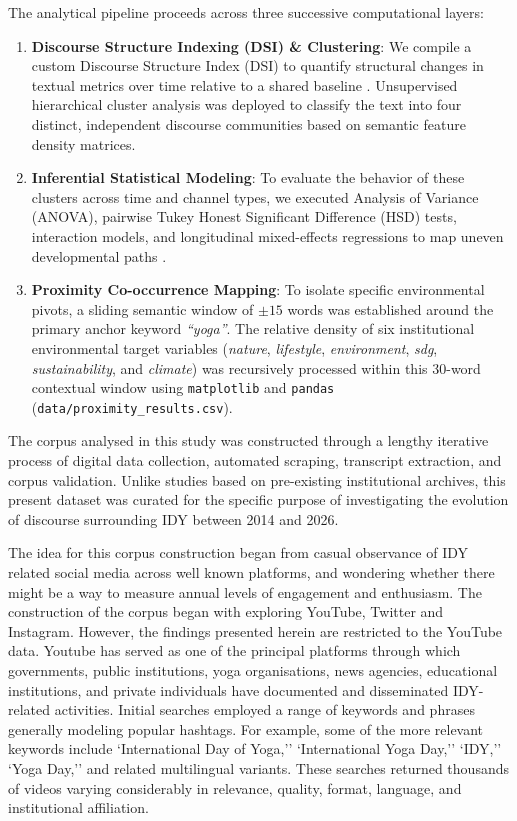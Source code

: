 \documentclass[11pt]{article}
\begin{document}
The analytical pipeline proceeds across three successive computational layers:
\begin{enumerate}
    \item \textbf{Discourse Structure Indexing (DSI) \& Clustering}: We compile a custom Discourse Structure Index (DSI) to quantify structural changes in textual metrics over time relative to a shared baseline \cite{paranyushkin2019}. Unsupervised hierarchical cluster analysis was deployed to classify the text into four distinct, independent discourse communities based on semantic feature density matrices.
    \item \textbf{Inferential Statistical Modeling}: To evaluate the behavior of these clusters across time and channel types, we executed Analysis of Variance (ANOVA), pairwise Tukey Honest Significant Difference (HSD) tests, interaction models, and longitudinal mixed-effects regressions to map uneven developmental paths \cite{gries2015}.
    \item \textbf{Proximity Co-occurrence Mapping}: To isolate specific environmental pivots, a sliding semantic window of $\pm15$ words was established around the primary anchor keyword \textit{``yoga''}. The relative density of six institutional environmental target variables (\textit{nature}, \textit{lifestyle}, \textit{environment}, \textit{sdg}, \textit{sustainability}, and \textit{climate}) was recursively processed within this 30-word contextual window using \texttt{matplotlib} and \texttt{pandas} (\texttt{data/proximity\_results.csv}).
\end{enumerate}

The corpus analysed in this study was constructed through a lengthy iterative process of digital data collection, automated scraping, transcript extraction, and corpus validation. Unlike studies based on pre-existing institutional archives, this present dataset was curated for the specific purpose of investigating the evolution of discourse surrounding IDY between 2014 and 2026.

The idea for this corpus construction began from casual observance of IDY related social media across well known platforms, and wondering whether there might be a way to measure annual levels of engagement and enthusiasm. The construction of the corpus began with exploring YouTube, Twitter and Instagram. However, the findings presented herein are restricted to the YouTube data. Youtube has served as one of the principal platforms through which governments, public institutions, yoga organisations, news agencies, educational institutions, and private individuals have documented and disseminated IDY-related activities. Initial searches employed a range of keywords and phrases generally modeling popular hashtags. For example, some of the more relevant keywords include `International Day of Yoga,'' `International Yoga Day,'' `IDY,'' `Yoga Day,'' and related multilingual variants. These searches returned thousands of videos varying considerably in relevance, quality, format, language, and institutional affiliation.
\end{document}
